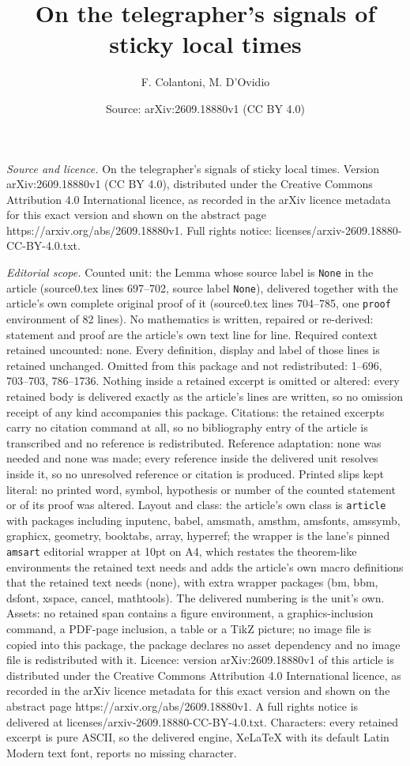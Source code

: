 \documentclass[10pt,a4paper]{amsart}
\title[On the telegrapher's signals of sticky local times]{On the telegrapher's signals of sticky local times}
\author{F. Colantoni, M. D'Ovidio}
\date{Source: arXiv:2609.18880v1 (CC BY 4.0)}
\begin{document}
\maketitle

\noindent\emph{Source and licence.} On the telegrapher's signals of sticky local times. Version arXiv:2609.18880v1 (CC BY 4.0), distributed under the Creative Commons Attribution 4.0 International licence, as recorded in the arXiv licence metadata for this exact version and shown on the abstract page https://arxiv.org/abs/2609.18880v1. Full rights notice: licenses/arxiv-2609.18880-CC-BY-4.0.txt.\par\smallskip

\noindent\textit{Editorial scope.} Counted unit: the Lemma whose source label is \texttt{None} in the article (source0.tex lines 697--702, source label \texttt{None}), delivered together with the article's own complete original proof of it (source0.tex lines 704--785, one \texttt{proof} environment of 82 lines). No mathematics is written, repaired or re-derived: statement and proof are the article's own text line for line. Required context retained uncounted: none. Every definition, display and label of those lines is retained unchanged. Omitted from this package and not redistributed: 1--696, 703--703, 786--1736. Nothing inside a retained excerpt is omitted or altered: every retained body is delivered exactly as the article's lines are written, so no omission receipt of any kind accompanies this package. Citations: the retained excerpts carry no citation command at all, so no bibliography entry of the article is transcribed and no reference is redistributed. Reference adaptation: none was needed and none was made; every reference inside the delivered unit resolves inside it, so no unresolved reference or citation is produced. Printed slips kept literal: no printed word, symbol, hypothesis or number of the counted statement or of its proof was altered. Layout and class: the article's own class is \texttt{article} with packages including inputenc, babel, amsmath, amsthm, amsfonts, amssymb, graphicx, geometry, booktabs, array, hyperref; the wrapper is the lane's pinned \texttt{amsart} editorial wrapper at 10pt on A4, which restates the theorem-like environments the retained text needs and adds the article's own macro definitions that the retained text needs (none), with extra wrapper packages (bm, bbm, dsfont, xspace, cancel, mathtools). The delivered numbering is the unit's own. Assets: no retained span contains a figure environment, a graphics-inclusion command, a PDF-page inclusion, a table or a TikZ picture; no image file is copied into this package, the package declares no asset dependency and no image file is redistributed with it. Licence: version arXiv:2609.18880v1 of this article is distributed under the Creative Commons Attribution 4.0 International licence, as recorded in the arXiv licence metadata for this exact version and shown on the abstract page https://arxiv.org/abs/2609.18880v1. A full rights notice is delivered at licenses/arxiv-2609.18880-CC-BY-4.0.txt. Characters: every retained excerpt is pure ASCII, so the delivered engine, XeLaTeX with its default Latin Modern text font, reports no missing character.
\end{document}
